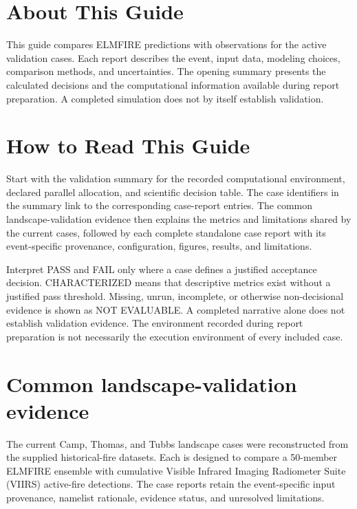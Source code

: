 \documentclass[12pt]{article}
\begin{document}
\newcommand{\GuideTitle}{ELMFIRE Validation Guide}



\section*{About This Guide}
{}
This guide compares ELMFIRE predictions with observations for the active
validation cases. Each report describes the event, input data, modeling choices,
comparison methods, and uncertainties. The opening summary presents the
calculated decisions and the computational information available during report
preparation. A completed simulation does not by itself establish validation.

\clearpage
\tableofcontents
\clearpage

\section{How to Read This Guide}

Start with the validation summary for the recorded computational environment,
declared parallel allocation, and scientific decision table. The
case identifiers in the summary link to the corresponding case-report entries.
The common landscape-validation evidence then explains the metrics and
limitations shared by the current cases, followed by each complete standalone
case report with its event-specific provenance, configuration, figures,
results, and limitations.

Interpret PASS and FAIL only where a case defines a justified acceptance
decision.  CHARACTERIZED means that descriptive metrics exist without a
justified pass threshold.  Missing, unrun, incomplete, or otherwise
non-decisional evidence is shown as NOT EVALUABLE. A completed narrative alone
does not establish validation evidence. The environment recorded during report
preparation is not necessarily the
execution environment of every included case.



\section{Common landscape-validation evidence}

The current Camp, Thomas, and Tubbs landscape cases were reconstructed from the
supplied historical-fire datasets. Each is designed to
compare a 50-member ELMFIRE ensemble with cumulative Visible Infrared Imaging
Radiometer Suite (VIIRS) active-fire
detections.  The case reports retain the event-specific input provenance,
namelist rationale, evidence status, and unresolved limitations.
\end{document}
